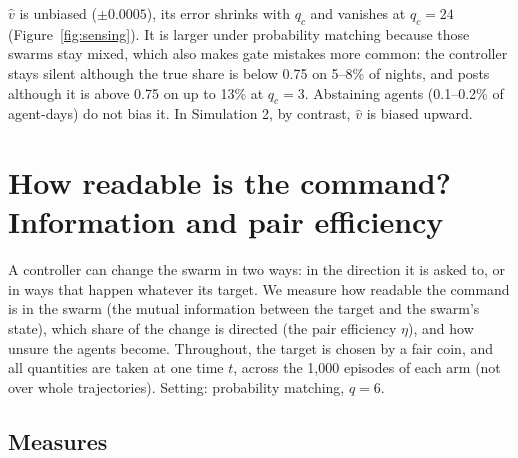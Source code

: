 \documentclass[10pt,a4paper]{article}
\begin{document}
$\hat v$ is unbiased ($\pm 0.0005$), its error shrinks with $q_c$ and vanishes at
$q_c = 24$ (Figure~\ref{fig:sensing}). It is larger under probability matching because
those swarms stay mixed, which also makes gate mistakes more common: the controller
stays silent although the true share is below 0.75 on 5--8\% of nights, and posts
although it is above 0.75 on up to 13\% at $q_c = 3$. Abstaining agents (0.1--0.2\% of
agent-days) do not bias it. In Simulation 2, by contrast, $\hat v$ is biased upward.

\section{How readable is the command? Information and pair efficiency}\label{sec:eff}

A controller can change the swarm in two ways: in the direction it is asked to, or in ways that
happen whatever its target. We measure how readable the command is in the swarm (the mutual
information between the target and the swarm's state), which share of the change is directed (the
pair efficiency $\eta$), and how unsure the agents become. Throughout, the target is chosen by a fair
coin, and all quantities are taken at one time $t$, across the 1{,}000 episodes of each arm (not over
whole trajectories). Setting: probability matching, $q = 6$.

\subsection{Measures}
\end{document}

